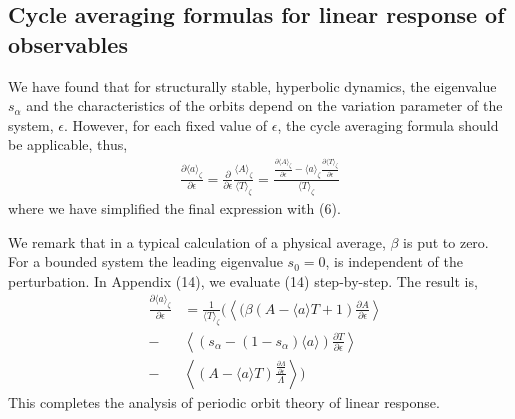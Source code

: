 \documentclass[twocolumn,aip,cha]{revtex4-1}
\begin{document}
\subsection{Cycle averaging formulas for linear response of observables}
We have found that for structurally stable, hyperbolic dynamics, the eigenvalue $s_{\alpha}$ and the characteristics of the orbits depend on the variation parameter of the system, $\epsilon$. However, for each fixed value of $\epsilon$, the cycle averaging formula should be applicable, thus,
\begin{eqnarray}
\frac{\partial \langle a\rangle_{\zeta}}{\partial \epsilon} = \frac{\partial}{\partial \epsilon}\frac{\langle A \rangle_{\zeta}}{\langle T \rangle_{\zeta}} =
\frac{\frac{\partial \langle A \rangle_{\zeta}}{\partial \epsilon} - \langle a \rangle_{\zeta}\frac{\partial \langle T \rangle_{\zeta}}{\partial \epsilon}}{\langle T \rangle_{\zeta}}
\end{eqnarray}
where we have simplified the final expression with (6).

\indent We remark that in a typical calculation of a physical average, $\beta$ is put to zero. For a bounded system the leading eigenvalue $s_{0}=0$, is independent of the perturbation. In Appendix (14), we evaluate (14) step-by-step. The result is,
\begin{eqnarray*}
&\frac{\partial \langle a\rangle_{\zeta}}{\partial \epsilon}& = \frac{1}{\langle T \rangle_{\zeta}}\Bigg( \left\langle (\beta(A-\langle a\rangle T + 1)\frac{\partial A}{\partial \epsilon}\right\rangle \\ &-& \left\langle (s_{\alpha}-(1-s_{\alpha})\langle a\rangle)\frac{\partial T}{\partial \epsilon}\right\rangle  \\
&-&\left\langle (A-\langle a \rangle T) \frac{\frac{\partial \Lambda}{\partial \epsilon}}{\Lambda}\right\rangle \Bigg)
\end{eqnarray*}
This completes the analysis of periodic orbit theory of linear response.
\end{document}
